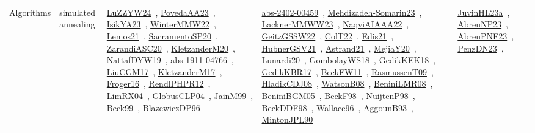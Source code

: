 {\begin{longtable}{lp{3cm}>{\raggedright\arraybackslash}p{6cm}>{\raggedright\arraybackslash}p{6cm}>{\raggedright\arraybackslash}p{8cm}}
\index{simulated annealing}\index{Algorithms!simulated annealing}Algorithms & simulated annealing & \href{../works/LuZZYW24.pdf}{LuZZYW24}~\cite{LuZZYW24}, \href{../works/PovedaAA23.pdf}{PovedaAA23}~\cite{PovedaAA23}, \href{../works/IsikYA23.pdf}{IsikYA23}~\cite{IsikYA23}, \href{../works/WinterMMW22.pdf}{WinterMMW22}~\cite{WinterMMW22}, \href{../works/Lemos21.pdf}{Lemos21}~\cite{Lemos21}, \href{../works/SacramentoSP20.pdf}{SacramentoSP20}~\cite{SacramentoSP20}, \href{../works/ZarandiASC20.pdf}{ZarandiASC20}~\cite{ZarandiASC20}, \href{../works/KletzanderM20.pdf}{KletzanderM20}~\cite{KletzanderM20}, \href{../works/NattafDYW19.pdf}{NattafDYW19}~\cite{NattafDYW19}, \href{../works/abs-1911-04766.pdf}{abs-1911-04766}~\cite{abs-1911-04766}, \href{../works/LiuCGM17.pdf}{LiuCGM17}~\cite{LiuCGM17}, \href{../works/KletzanderM17.pdf}{KletzanderM17}~\cite{KletzanderM17}, \href{../works/Froger16.pdf}{Froger16}~\cite{Froger16}, \href{../works/RendlPHPR12.pdf}{RendlPHPR12}~\cite{RendlPHPR12}, \href{../works/LimRX04.pdf}{LimRX04}~\cite{LimRX04}, \href{../works/GlobusCLP04.pdf}{GlobusCLP04}~\cite{GlobusCLP04}, \href{../works/JainM99.pdf}{JainM99}~\cite{JainM99}, \href{../works/Beck99.pdf}{Beck99}~\cite{Beck99}, \href{../works/BlazewiczDP96.pdf}{BlazewiczDP96}~\cite{BlazewiczDP96} & \href{../works/abs-2402-00459.pdf}{abs-2402-00459}~\cite{abs-2402-00459}, \href{../works/Mehdizadeh-Somarin23.pdf}{Mehdizadeh-Somarin23}~\cite{Mehdizadeh-Somarin23}, \href{../works/LacknerMMWW23.pdf}{LacknerMMWW23}~\cite{LacknerMMWW23}, \href{../works/NaqviAIAAA22.pdf}{NaqviAIAAA22}~\cite{NaqviAIAAA22}, \href{../works/GeitzGSSW22.pdf}{GeitzGSSW22}~\cite{GeitzGSSW22}, \href{../works/ColT22.pdf}{ColT22}~\cite{ColT22}, \href{../works/Edis21.pdf}{Edis21}~\cite{Edis21}, \href{../works/HubnerGSV21.pdf}{HubnerGSV21}~\cite{HubnerGSV21}, \href{../works/Astrand21.pdf}{Astrand21}~\cite{Astrand21}, \href{../works/MejiaY20.pdf}{MejiaY20}~\cite{MejiaY20}, \href{../works/Lunardi20.pdf}{Lunardi20}~\cite{Lunardi20}, \href{../works/GombolayWS18.pdf}{GombolayWS18}~\cite{GombolayWS18}, \href{../works/GedikKEK18.pdf}{GedikKEK18}~\cite{GedikKEK18}, \href{../works/GedikKBR17.pdf}{GedikKBR17}~\cite{GedikKBR17}, \href{../works/BeckFW11.pdf}{BeckFW11}~\cite{BeckFW11}, \href{../works/RasmussenT09.pdf}{RasmussenT09}~\cite{RasmussenT09}, \href{../works/HladikCDJ08.pdf}{HladikCDJ08}~\cite{HladikCDJ08}, \href{../works/WatsonB08.pdf}{WatsonB08}~\cite{WatsonB08}, \href{../works/BeniniLMR08.pdf}{BeniniLMR08}~\cite{BeniniLMR08}, \href{../works/BeniniBGM05.pdf}{BeniniBGM05}~\cite{BeniniBGM05}, \href{../works/BeckF98.pdf}{BeckF98}~\cite{BeckF98}, \href{../works/NuijtenP98.pdf}{NuijtenP98}~\cite{NuijtenP98}, \href{../works/BeckDDF98.pdf}{BeckDDF98}~\cite{BeckDDF98}, \href{../works/Wallace96.pdf}{Wallace96}~\cite{Wallace96}, \href{../works/AggounB93.pdf}{AggounB93}~\cite{AggounB93}, \href{../works/MintonJPL90.pdf}{MintonJPL90}~\cite{MintonJPL90} & \href{../works/JuvinHL23a.pdf}{JuvinHL23a}~\cite{JuvinHL23a}, \href{../works/AbreuNP23.pdf}{AbreuNP23}~\cite{AbreuNP23}, \href{../works/AbreuPNF23.pdf}{AbreuPNF23}~\cite{AbreuPNF23}, \href{../works/PenzDN23.pdf}{PenzDN23}~\cite{PenzDN23}, 
\end{longtable}}
